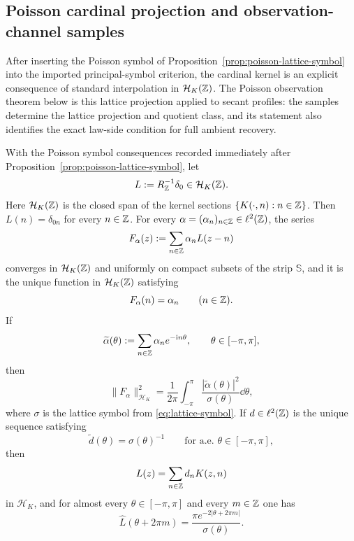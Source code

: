 
\subsection{Poisson cardinal projection and observation-channel samples}%
\label{subsec:poisson-cardinal-observation}

After inserting the Poisson symbol of
Proposition~\ref{prop:poisson-lattice-symbol} into the imported
principal-symbol criterion, the cardinal kernel is an explicit consequence of
standard interpolation in $\mathcal H_K(\mathbb{Z})$.  The Poisson observation theorem
below is this lattice projection applied to secant profiles: the samples
determine the lattice projection and quotient class, and its statement also
identifies the exact law-side condition for full ambient recovery.

\begin{corollary}%
\label{cor:poisson-cardinal-reconstruction}
With the Poisson symbol consequences recorded immediately after
Proposition~\ref{prop:poisson-lattice-symbol}, let
\[
L:=R_{\mathbb{Z}}^{-1}\delta_0\in\mathcal H_K(\mathbb{Z}).
\]
Here $\mathcal H_K(\mathbb{Z})$ is the closed span of the kernel sections
$\{K(\cdot,n):n\in\mathbb{Z}\}$.
Then $L(n)=\delta_{0n}$ for every $n\in\mathbb{Z}$.  For every
$\alpha=(\alpha_n)_{n\in\mathbb{Z}}\in\ell^2(\mathbb{Z})$, the series
\[
F_\alpha(z):=\sum_{n\in\mathbb{Z}}\alpha_nL(z-n)
\]
converges in $\mathcal H_K(\mathbb{Z})$ and uniformly on compact subsets of the
strip $\mathbb S$, and it is the unique function in $\mathcal H_K(\mathbb{Z})$
satisfying
\[
F_\alpha(n)=\alpha_n
\qquad(n\in\mathbb{Z}).
\]
If
\[
\widetilde\alpha(\theta):=\sum_{n\in\mathbb{Z}}\alpha_ne^{-\mathrm{i} n\theta},
\qquad \theta\in[-\pi,\pi],
\]
then
\begin{equation}\label{eq:cardinal-norm-formula}
\|F_\alpha\|_{\mathcal H_K}^2
=\frac{1}{2\pi}\int_{-\pi}^{\pi}
\frac{|\widetilde\alpha(\theta)|^2}{\sigma(\theta)}\dd\theta,
\end{equation}
where $\sigma$ is the lattice symbol from \eqref{eq:lattice-symbol}.  If
$d\in\ell^2(\mathbb{Z})$ is the unique sequence satisfying
\[
\widetilde d(\theta)=\sigma(\theta)^{-1}
\qquad\text{for a.e. }\theta\in[-\pi,\pi],
\]
then
\[
L(z)=\sum_{n\in\mathbb{Z}}d_nK(z,n)
\]
in $\mathcal H_K$, and for almost every $\theta\in[-\pi,\pi]$ and every
$m\in\mathbb{Z}$ one has
\begin{equation}\label{eq:cardinal-kernel-fourier}
\widehat L(\theta+2\pi m)
=\frac{\pi e^{-2|\theta+2\pi m|}}{\sigma(\theta)}.
\end{equation}
\end{corollary}

